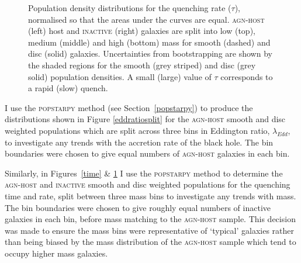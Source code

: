\begin{figure}
\caption[Quenching rate population density distributions for the \textsc{agn-host} and \textsc{inactive} samples]{Population density distributions for the quenching rate ($\tau$), normalised so that the areas under the curves are equal. \textsc{agn-host} (left) host and \textsc{inactive} (right) galaxies are split into low (top), medium (middle) and high (bottom) mass for smooth (dashed) and disc (solid) galaxies. Uncertainties from bootstrapping are shown by the shaded regions for the smooth (grey striped) and disc (grey solid) population densities. A small (large) value of $\tau$ corresponds to a rapid (slow) quench.}
\label{rate}
\end{figure}



I use the \textsc{popstarpy} method (see Section~\ref{popstarpy}) to produce the distributions shown in Figure \ref{eddratiosplit} for the \textsc{agn-host} smooth and disc weighted populations which are split across three bins in Eddington ratio, $\lambda_{Edd}$, to investigate any trends with the accretion rate of the black hole. The bin boundaries were chosen to give equal numbers of \textsc{agn-host} galaxies in each bin. 

Similarly, in Figures~\ref{time} \& \ref{rate} I use the \textsc{popstarpy} method to determine the \textsc{agn-host} and \textsc{inactive} smooth and disc weighted populations for the quenching time and rate, split between three mass bins to investigate any trends with mass. The bin boundaries were chosen to give roughly equal numbers of inactive galaxies in each bin, before mass matching to the \textsc{agn-host} sample. This decision was made to ensure the mass bins were representative of `typical' galaxies rather than being biased by the mass distribution of the \textsc{agn-host} sample which tend to occupy higher mass galaxies. 

